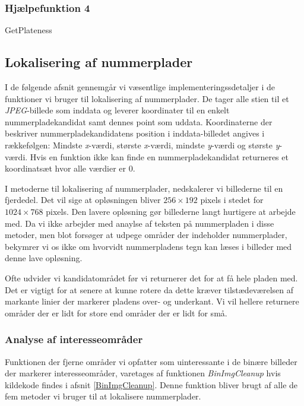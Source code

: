\subsubsection{Hjælpefunktion 4}
\label{sec:imp:GetPlateness}
GetPlateness

\subsection{Lokalisering af nummerplader}
I de følgende afsnit gennemgår vi væsentlige implementeringssdetaljer i de funktioner vi bruger til lokalisering af nummerplader. De tager alle stien til et \textit{JPEG}-billede som inddata og leverer koordinater til en enkelt nummerpladekandidat samt dennes point som uddata. Koordinaterne der beskriver nummerpladekandidatens position i inddata-billedet angives i rækkefølgen: Mindste \textit{x}-værdi, største \textit{x}-værdi, mindste \textit{y}-værdi og største \textit{y}-værdi. Hvis en funktion ikke kan finde en nummerpladekandidat returneres et koordinatsæt hvor alle værdier er $0$.

I metoderne til lokalisering af nummerplader, nedskalerer vi billederne til en fjerdedel. Det vil sige at opløsningen bliver $256 \times 192$ pixels i stedet for $1024 \times 768$ pixels. Den lavere opløsning gør billederne langt hurtigere at arbejde med. Da vi ikke arbejder med anaylse af teksten på nummerpladen i disse metoder, men blot forsøger at udpege områder der indeholder nummerplader, bekymrer vi os ikke om hvorvidt nummerpladens tegn kan læses i billeder med denne lave opløsning.

Ofte udvider vi kandidatområdet før vi returnerer det for at få hele pladen med. Det er vigtigt for at senere at kunne rotere da dette kræver tilstædeværelsen af markante linier der markerer pladens over- og underkant. Vi vil hellere returnere områder der er lidt for store end områder der er lidt for små.%


\subsubsection{Analyse af interesseområder}
\label{sec:imp:BinImgCleanup}
Funktionen der fjerne områder vi opfatter som uinteressante i de binære billeder der markerer interesseområder, varetages af funktionen \textit{BinImgCleanup} hvis kildekode findes i afsnit \vref{BinImgCleanup}. Denne funktion bliver brugt af alle de fem metoder vi bruger til at lokalisere nummerplader.


